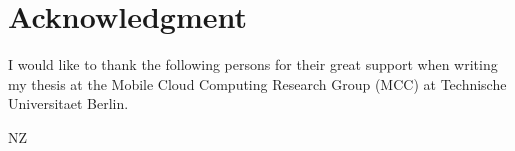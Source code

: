 
\cleardoublepage
{}
\section*{Acknowledgment}

I would like to thank the following persons for their great support when writing my thesis at the Mobile Cloud Computing Research Group (MCC) at Technische Universitaet Berlin.

\begin{flushright}
NZ\\[1pc]
\end{flushright}
